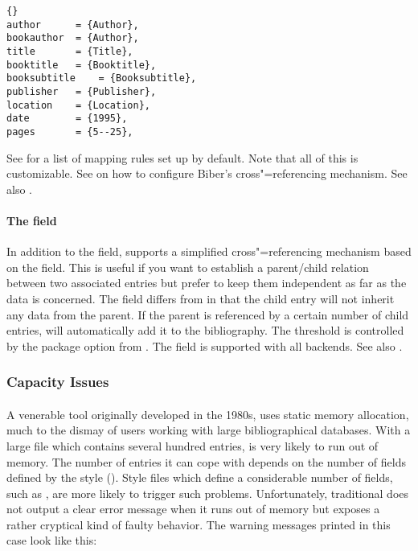 \documentclass{ltxdockit}[2011/03/25]
\newcommand*{\biber}{Biber\xspace}
\begin{document}
\begin{lstlisting}[style=bibtex]{}
author	  	= {Author},
bookauthor	= {Author},
title		= {Title},
booktitle	= {Booktitle},
booksubtitle	= {Booksubtitle},
publisher	= {Publisher},
location	= {Location},
date		= {1995},
pages		= {5--25},
\end{lstlisting}
%
See  for a list of mapping rules set up by default. Note that all of this is customizable. See  on how to configure \biber's cross"=referencing mechanism. See also .

\paragraph{The  field}
\label{bib:cav:ref:ref}

In addition to the  field,  supports a simplified cross"=referencing mechanism based on the  field. This is useful if you want to establish a parent\slash child relation between two associated entries but prefer to keep them independent as far as the data is concerned. The  field differs from  in that the child entry will not inherit any data from the parent. If the parent is referenced by a certain number of child entries,  will automatically add it to the bibliography. The threshold is controlled by the  package option from . The  field is supported with all backends. See also .

\subsubsection{Capacity Issues}
\label{bib:cav:btx}

\paragraph{\bibtex}
A venerable tool originally developed in the 1980s, \bibtex uses static memory allocation, much to the dismay of users working with large bibliographical databases. With a large  file which contains several hundred entries, \bibtex is very likely to run out of memory. The number of entries it can cope with depends on the number of fields defined by the \bibtex style (). Style files which define a considerable number of fields, such as , are more likely to trigger such problems. Unfortunately, traditional \bibtex does not output a clear error message when it runs out of memory but exposes a rather cryptical kind of faulty behavior. The warning messages printed in this case look like this:
\end{document}
